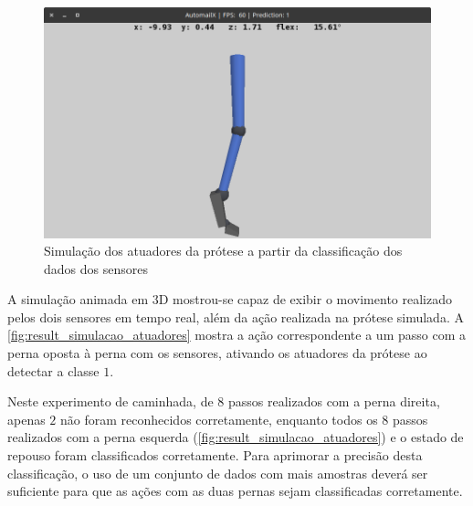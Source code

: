 \begin{figure}[ht]
	\caption{\label{fig:result_simulacao_atuadores}Simulação dos atuadores da prótese a partir da classificação dos dados dos sensores}
	\begin{center}
		\includegraphics[width=\textwidth]{resources/result_simulacao_atuadores}
	\end{center}
\end{figure}

A simulação animada em 3D mostrou-se capaz de exibir o movimento realizado pelos dois sensores em tempo real, além da ação realizada na prótese simulada. A \autoref{fig:result_simulacao_atuadores} mostra a ação correspondente a um passo com a perna oposta à perna com os sensores, ativando os atuadores da prótese ao detectar a classe \(1\).

Neste experimento de caminhada, de \(8\) passos realizados com a perna direita, apenas \(2\) não foram reconhecidos corretamente, enquanto todos os \(8\) passos realizados com a perna esquerda (\autoref{fig:result_simulacao_atuadores}) e o estado de repouso foram classificados corretamente. Para aprimorar a precisão desta classificação, o uso de um conjunto de dados com mais amostras deverá ser suficiente para que as ações com as duas pernas sejam classificadas corretamente.
